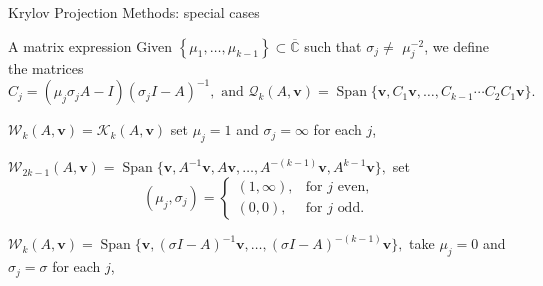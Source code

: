 \documentclass[aspectratio=169,xcolor=dvipsnames]{beamer}
\begin{document}
\begin{frame}{Krylov Projection Methods: special cases}

\begin{block}{A matrix expression}
	Given $\left\{ \mu _{1},\dots, \mu _{k-1}\right\} \subset \overline{\mathbb{C}}$
	such that $\sigma _{j}\neq $ $\mu _{j}^{-2}$, we define the matrices
	\begin{equation*}
	C_{j}=\left( \mu _{j}\sigma _{j}A-I\right) (\sigma _{j}I-A)^{-1}, \text{ and } \mathcal{Q}_{k}(A,\mathbf{v})=\operatorname{Span}\{\mathbf{v},C_{1}\mathbf{v}%
	,\ldots ,C_{k-1}\cdots C_2 C_{1}\mathbf{v}\}.
	\end{equation*}
\end{block}

\begin{description}
	\item<1->[Polynomial Krylov] $\mathcal{W}_{k}(A,\mathbf{v})=\mathcal{K}_{k}(A,%
	\mathbf{v})$ set $\mu _{j}=1$ and $\sigma
	_{j}=\infty $ for each $j$,
	\item<2->[Extended Krylov] $\mathcal{W}_{2k-1}(A,\mathbf{v})=\operatorname{Span}\{\mathbf{v}, A^{-1}%
	\mathbf{v}, A\mathbf{v}, \ldots, A^{-(k-1)}\mathbf{v}, A^{k-1}%
	\mathbf{v}\},$ set
	\begin{equation*}
	(\mu _j,\sigma_j)= \left\lbrace \begin{array}{ll}
	(1,\infty), & \mbox{for  $j$ even},\\
	(0,0),  & \mbox{for  $j$  odd.}
	\end{array}\right.
	\end{equation*}
	\item<3->[Shift-And-Invert] $\mathcal{W}_{k}(A,\mathbf{v})=\operatorname{Span}\{\mathbf{v},(\sigma
	I-A)^{-1}\mathbf{v},\ldots ,(\sigma I-A)^{-(k-1)}\mathbf{v}\},$ take $\mu _{j}=0$ and $\sigma _{j}=\sigma $ for each $j$,
\end{description}

\end{frame}
\end{document}
